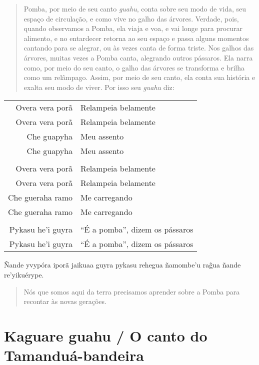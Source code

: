 \begin{quote}
Pomba, por meio de seu canto \emph{guahu}, conta sobre seu modo de vida,
seu espaço de circulação, e como vive no galho das árvores. Verdade,
pois, quando observamos a Pomba, ela viaja e voa, e vai longe para
procurar alimento, e no entardecer retorna ao seu espaço e passa alguns
momentos cantando para se alegrar, ou às vezes canta de forma triste.
Nos galhos das árvores, muitas vezes a Pomba canta, alegrando outros
pássaros. Ela narra como, por meio do seu canto, o galho das árvores se
transforma e brilha como um relâmpago. Assim, por meio de seu canto, ela
conta sua história e exalta seu modo de viver. Por isso seu \emph{guahu}
diz:
\end{quote}


\begin{table}[]
\begin{tabular}{rl}
Overa vera porã          & Relampeia belamente           \\
Overa vera porã          & Relampeia belamente           \\
Che guapyha  		& Meu assento \\
Che guapyha          & Meu assento           \\
                  &                     \\
Overa vera porã          & Relampeia belamente           \\
Overa vera porã  		& Relampeia belamente \\
Che gueraha ramo          & Me carregando           \\
Che gueraha ramo          & Me carregando           \\                  
                  &                     \\
Pykasu he'i guyra  		& ``É a pomba'', dizem os pássaros \\
Pykasu he'i guyra          & ``É a pomba'', dizem os pássaros           \\
\end{tabular}
\end{table}




Ñande yvypóra iporã jaikuaa guyra pykasu rehegua ñamombe'u rag̃ua ñande
re'yikuérype.

\begin{quote}
Nós que somos aqui da terra precisamos aprender sobre a Pomba para
recontar às novas gerações.
\end{quote}

\chapter{Kaguare guahu / O canto do Tamanduá-bandeira}

